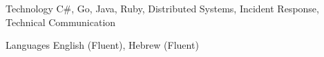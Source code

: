 

\begin{cvskills}

  \cvskill
    {Technology} %
    {C\#, Go, Java, Ruby, Distributed Systems, Incident Response, Technical Communication}

  \cvskill
    {Languages} %
    {English (Fluent), Hebrew (Fluent)} %

\end{cvskills}
